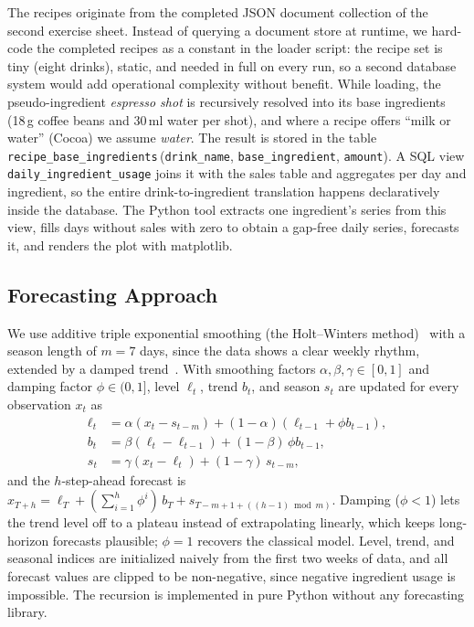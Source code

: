 \documentclass[conference]{IEEEtran}
\begin{document}
The recipes originate from the completed JSON document collection of the second
exercise sheet. Instead of querying a document store at runtime, we hard-code the
completed recipes as a constant in the loader script: the recipe set is tiny (eight
drinks), static, and needed in full on every run, so a second database system would
add operational complexity without benefit. While loading, the pseudo-ingredient
\emph{espresso shot} is recursively resolved into its base ingredients (18\,g coffee
beans and 30\,ml water per shot), and where a recipe offers ``milk or water'' (Cocoa)
we assume \emph{water}. The result is stored in the table
\texttt{recipe\_base\_ingredients}\,(\texttt{drink\_name},
\texttt{base\_ingredient}, \texttt{amount}). A SQL view
\texttt{daily\_ingredient\_usage} joins it with the sales table and aggregates per day
and ingredient, so the entire drink-to-ingredient translation happens declaratively
inside the database. The Python tool extracts one ingredient's series from this view,
fills days without sales with zero to obtain a gap-free daily series, forecasts it,
and renders the plot with matplotlib.

\subsection{Forecasting Approach}
We use additive triple exponential smoothing (the Holt--Winters
method)~\cite{holt2004,winters1960,hyndman2021fpp3} with a season length of $m=7$ days, since the
data shows a clear weekly rhythm, extended by a damped trend~\cite{gardner1985,hyndman2021fpp3}.
With smoothing factors $\alpha,\beta,\gamma \in [0,1]$ and damping factor
$\phi \in (0,1]$, level $\ell_t$, trend $b_t$, and season $s_t$ are updated for every
observation $x_t$ as
\begin{align}
\ell_t &= \alpha (x_t - s_{t-m}) + (1-\alpha)(\ell_{t-1} + \phi b_{t-1}),\\
b_t &= \beta (\ell_t - \ell_{t-1}) + (1-\beta)\,\phi b_{t-1},\\
s_t &= \gamma (x_t - \ell_t) + (1-\gamma)\,s_{t-m},
\end{align}
and the $h$-step-ahead forecast is
$\hat{x}_{T+h} = \ell_T + (\sum_{i=1}^{h}\phi^{i})\,b_T + s_{T-m+1+((h-1) \bmod m)}$.
Damping ($\phi<1$) lets the trend level off to a plateau instead of extrapolating
linearly, which keeps long-horizon forecasts plausible; $\phi=1$ recovers the
classical model. Level, trend, and seasonal indices are initialized naively from the
first two weeks of data, and all forecast values are clipped to be non-negative, since
negative ingredient usage is impossible. The recursion is implemented in pure Python
without any forecasting library.
\end{document}
